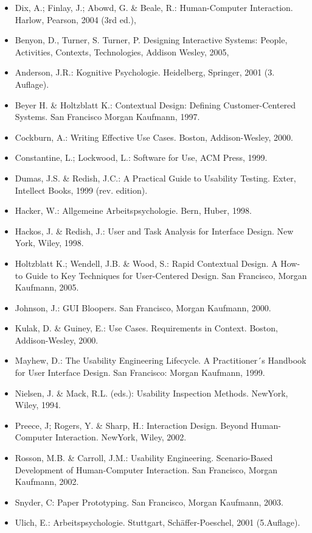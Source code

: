 \begin{itemize}
\item
  Dix, A.; Finlay, J.; Abowd, G. \& Beale, R.: Human-Computer
  Interaction. Harlow, Pearson, 2004 (3rd ed.),
\item
  Benyon, D., Turner, S. Turner, P. Designing Interactive Systems:
  People, Activities, Contexts, Technologies, Addison Wesley, 2005,
\item
  Anderson, J.R.: Kognitive Psychologie. Heidelberg, Springer, 2001 (3.
  Auflage).
\item
  Beyer H. \& Holtzblatt K.: Contextual Design: Defining
  Customer-Centered Systems. San Francisco Morgan Kaufmann, 1997.
\item
  Cockburn, A.: Writing Effective Use Cases. Boston, Addison-Wesley,
  2000.
\item
  Constantine, L.; Lockwood, L.: Software for Use, ACM Press, 1999.
\item
  Dumas, J.S. \& Redish, J.C.: A Practical Guide to Usability Testing.
  Exter, Intellect Books, 1999 (rev. edition).
\item
  Hacker, W.: Allgemeine Arbeitspsychologie. Bern, Huber, 1998.
\item
  Hackos, J. \& Redish, J.: User and Task Analysis for Interface Design.
  New York, Wiley, 1998.
\item
  Holtzblatt K.; Wendell, J.B. \& Wood, S.: Rapid Contextual Design. A
  How-to Guide to Key Techniques for User-Centered Design. San
  Francisco, Morgan Kaufmann, 2005.
\item
  Johnson, J.: GUI Bloopers. San Francisco, Morgan Kaufmann, 2000.
\item
  Kulak, D. \& Guiney, E.: Use Cases. Requirements in Context. Boston,
  Addison-Wesley, 2000.
\item
  Mayhew, D.: The Usability Engineering Lifecycle. A Practitioner´s
  Handbook for User Interface Design. San Francisco: Morgan Kaufmann,
  1999.
\item
  Nielsen, J. \& Mack, R.L. (eds.): Usability Inspection Methods.
  NewYork, Wiley, 1994.
\item
  Preece, J; Rogers, Y. \& Sharp, H.: Interaction Design. Beyond
  Human-Computer Interaction. NewYork, Wiley, 2002.
\item
  Rosson, M.B. \& Carroll, J.M.: Usability Engineering. Scenario-Based
  Development of Human-Computer Interaction. San Francisco, Morgan
  Kaufmann, 2002.
\item
  Snyder, C: Paper Prototyping. San Francisco, Morgan Kaufmann, 2003.
\item
  Ulich, E.: Arbeitspsychologie. Stuttgart, Schäffer-Poeschel, 2001
  (5.Auflage).
\end{itemize}

